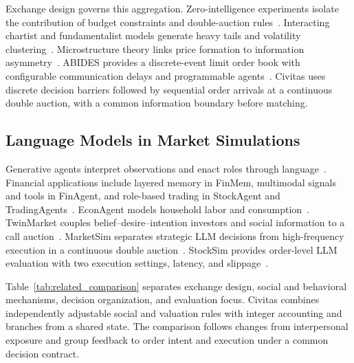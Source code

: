 Exchange design governs this aggregation. Zero-intelligence experiments isolate the contribution of budget constraints and double-auction rules~\cite{gode1993allocative}. Interacting chartist and fundamentalist models generate heavy tails and volatility clustering~\cite{lux1999scaling,lux2000volatility,raberto2001agent}. Microstructure theory links price formation to information asymmetry~\cite{kyle1985continuous,glosten1985bid}. ABIDES provides a discrete-event limit order book with configurable communication delays and programmable agents~\cite{abides2020}. Civitas uses discrete decision barriers followed by sequential order arrivals at a continuous double auction, with a common information boundary before matching.

\subsection{Language Models in Market Simulations}

Generative agents interpret observations and enact roles through language~\cite{park2023generative}. Financial applications include layered memory in FinMem, multimodal signals and tools in FinAgent, and role-based trading in StockAgent and TradingAgents~\cite{yu2023finmem,zhang2024finagent,li2024stockagent,xiao2024tradingagents}. EconAgent models household labor and consumption~\cite{li2024econagent}. TwinMarket couples belief--desire--intention investors and social information to a call auction~\cite{yang2025twinmarket}. MarketSim separates strategic LLM decisions from high-frequency execution in a continuous double auction~\cite{marketsim2026}. StockSim provides order-level LLM evaluation with two execution settings, latency, and slippage~\cite{papadakis2025stocksim}.

Table~\ref{tab:related_comparison} separates exchange design, social and behavioral mechanisms, decision organization, and evaluation focus. Civitas combines independently adjustable social and valuation rules with integer accounting and branches from a shared state. The comparison follows changes from interpersonal exposure and group feedback to order intent and execution under a common decision contract.


